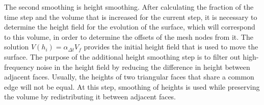 \documentclass[
11pt,%
tightenlines,%
twoside,%
onecolumn,%
nofloats,%
nobibnotes,%
nofootinbib,%
superscriptaddress,%
noshowpacs,%
centertags]%
{revtex4}
\begin{document}
The second smoothing is height smoothing.
After calculating the fraction of the time step and the volume that is increased for the current step, it is necessary to determine the height field for the evolution of the surface, which will correspond to this volume, in order to determine the offsets of the mesh nodes from it.
The solution $V(h_i) = \alpha_{\Delta t} V_f$ provides the initial height field that is used to move the surface.
The purpose of the additional height smoothing step is to filter out high-frequency noise in the height field by reducing the difference in height between adjacent faces.
Usually, the heights of two triangular faces that share a common edge will not be equal.
At this step, smoothing of heights is used while preserving the volume by redistributing it between adjacent faces.
\end{document}
